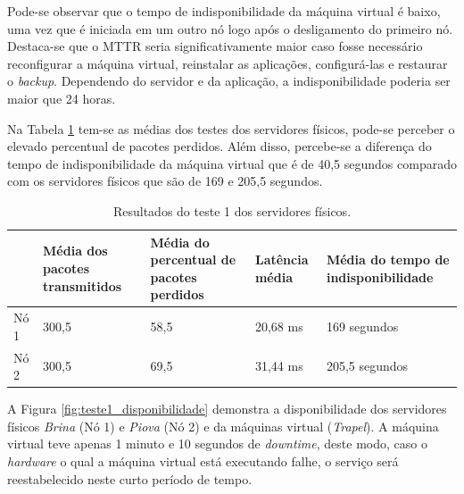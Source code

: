 Pode-se observar que o tempo de indisponibilidade da máquina virtual é baixo, uma vez que é iniciada em um outro nó logo após o desligamento do 
primeiro nó. Destaca-se que o \ac{MTTR} seria significativamente maior caso fosse necessário reconfigurar a máquina virtual, reinstalar as 
aplicações, configurá-las e restaurar o \textit{backup}. Dependendo do servidor e da aplicação, a indisponibilidade poderia ser maior que 24 horas.

Na Tabela \ref{tab:teste1resultados} tem-se as médias dos testes dos servidores físicos, pode-se perceber o elevado percentual de pacotes perdidos. 
Além disso, percebe-se a diferença do tempo de indisponibilidade da máquina virtual que é de 40,5 segundos comparado com os servidores 
físicos que são de 169 e 205,5 segundos.

\begin{table}[h!]
\caption{Resultados do teste 1 dos servidores físicos.}
\label{tab:teste1resultados}
\begin{center}
\begin{tabular}{|l|p{2.2cm}|p{2.5cm}|p{2cm}|p{2.7cm}|}\hline
 & \textbf{Média dos pacotes transmitidos} & \textbf{Média do percentual de pacotes perdidos} & \textbf{Latência média} & \textbf{Média do tempo de indisponibilidade} \\\hline
Nó 1 & 300,5 & 58,5 & 20,68 ms & 169 segundos \\\hline
Nó 2 & 300,5 & 69,5 & 31,44 ms & 205,5 segundos \\\hline
\end{tabular}
\end{center}
\end{table}

A Figura \ref{fig:teste1_disponibilidade} demonstra a disponibilidade dos servidores físicos \textit{Brina} (Nó 1) e \textit{Piova} (Nó 2) e da 
máquinas virtual (\textit{Trapel}). A máquina virtual teve apenas 1 minuto e 10 segundos de \textit{downtime}, deste modo, caso o 
\textit{hardware} o qual a máquina virtual está executando falhe, o serviço será reestabelecido neste curto período de tempo.

